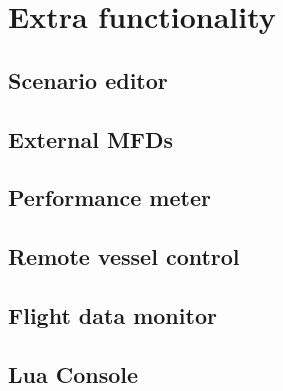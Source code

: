\documentclass[Orbiter User Manual.tex]{subfiles}
\begin{document}
\section{Extra functionality}

\subsection{Scenario editor}

\subsection{External MFDs}

\subsection{Performance meter}

\subsection{Remote vessel control}

\subsection{Flight data monitor}

\subsection{Lua Console}
\end{document}
